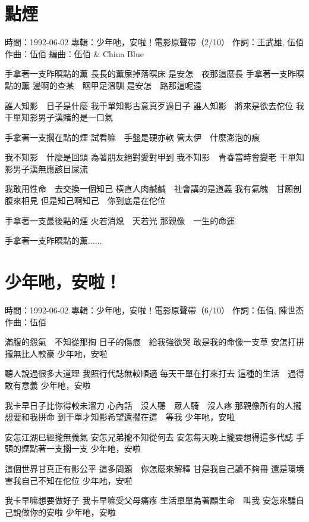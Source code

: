 \documentclass[UTF8,a4paper,oneside,twocolumn,12pt]{ctexbook}
\newcommand{\infopair}[2]{\textbullet #1：#2}
\newcommand{\zc}[1][伍佰]{\infopair{作詞}{#1}}
\newcommand{\zq}[1][伍佰]{\infopair{作曲}{#1}}
\newcommand{\bq}[1][伍佰]{\infopair{編曲}{#1}}
\newcommand{\zj}[1]{\infopair{專輯}{#1}}
\newcommand{\sj}[1]{\infopair{時間}{#1}}
\newenvironment{info}{\begin{flushleft}\kaishu
	}
	{\end{flushleft}\normalsize\yahei\par}
\newenvironment{lyric}{
	}
{}
\begin{document}
\section{點煙}
\begin{info}
	\sj{1992-06-02}
	\zj{少年吔，安啦！電影原聲帶（2/10）}
	\zc[王武雄, 伍佰]
	\zq
	\bq[伍佰 \& China Blue]
\end{info}
\begin{lyric}
	手拿著一支昨暝點的薰
	長長的薰屎掉落暝床
	是安怎　夜那這麼長
	手拿著一支昨暝點的薰
	邊啊的查某　睏甲足溫馴
	是安怎　路那這呢遠

	誰人知影　日子是什麼
	我干單知影古意真歹過日子
	誰人知影　將來是欲去佗位
	我干單知影男子漢賭的是一口氣

	手拿著一支擱在點的煙
	試看嘛　手盤是硬亦軟
	管太伊　什麼澎泡的痕

	我不知影　什麼是回頭
	為著朋友絕對愛對甲到
	我不知影　青春當時會變老
	干單知影男子漢無應該目屎流

	我敢用性命　去交換一個知己
	橫直人肉鹹鹹　社會講的是道義
	我有氣魄　甘願剖腹來相見
	但是知己啊知己　你到底是在佗位

	手拿著一支最後點的煙
	火若消熄　天若光
	那親像　一生的命運

	手拿著一支昨暝點的薰......
\end{lyric}

\section{少年吔，安啦！}
\begin{info}
	\sj{1992-06-02}
	\zj{少年吔，安啦！電影原聲帶（6/10）}
	\zc[伍佰, 陳世杰]
	\zq
\end{info}
\begin{lyric}
	滿腹的怨氣　不知從那掏
	日子的傷痕　給我強欲哭
	敢是我的命像一支草
	安怎打拼攏無比人較豪
	少年吔，安啦

	聽人說過很多大道理
	我照行代誌無較順適
	每天干單在打來打去
	這種的生活　過得敢有意義
	少年吔，安啦

	我卡早日子比你得較未溜力
	心內話　沒人聽　眾人騎　沒人疼
	那親像所有的人攏想要和我拼命
	到干單才知影希望還擱在這　等我
	少年吔，安啦

	安怎江湖已經攏無義氣
	安怎兄弟攏不知從何去
	安怎每天晚上攏要想得這多代誌
	手頭的煙點著一支擱一支
	少年吔，安啦

	這個世界甘真正有影公平
	這多問題　你怎麼來解釋
	甘是我自己讀不夠冊
	還是環境害我自己不知在佗位
	少年吔，安啦

	我卡早嘛想要做好子
	我卡早嘛受父母痛疼
	生活單單為著顧生命　叫我
	安怎來騙自己說做你的安啦
	少年吔，安啦
\end{lyric}
\end{document}
